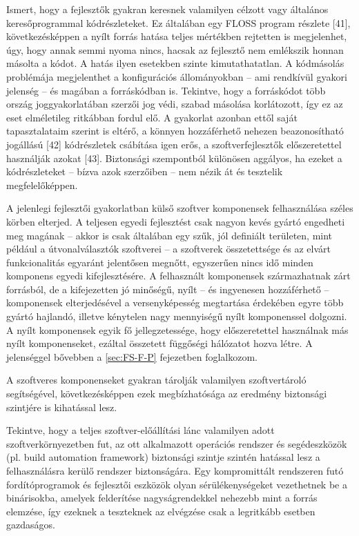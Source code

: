 \documentclass[12pt,magyar,a4paper,oneside]{scrreprt}
\begin{document}
Ismert, hogy a fejlesztők gyakran keresnek valamilyen célzott vagy
általános keresőprogrammal kódrészleteket. Ez általában egy FLOSS
program részlete {[}41{]}, következésképpen a nyílt forrás hatása teljes
mértékben rejtetten is megjelenhet, úgy, hogy annak semmi nyoma nincs,
hacsak az fejlesztő nem emlékszik honnan másolta a kódot. A hatás ilyen
esetekben szinte kimutathatatlan. A kódmásolás problémája megjelenthet a
konfigurációs állományokban -- ami rendkívül gyakori jelenség -- és
magában a forráskódban is. Tekintve, hogy a forráskódot több ország
joggyakorlatában szerzői jog védi, szabad másolása korlátozott, így ez
az eset elméletileg ritkábban fordul elő. A gyakorlat azonban ettől
saját tapasztalataim szerint is eltérő, a könnyen hozzáférhető nehezen
beazonosítható jogállású {[}42{]} kódrészletek csábítása igen erős, a
szoftverfejlesztők előszeretettel használják azokat {[}43{]}. Biztonsági
szempontból különösen aggályos, ha ezeket a kódrészleteket -- bízva azok
szerzőiben -- nem nézik át és tesztelik megfelelőképpen.

A jelenlegi fejlesztői gyakorlatban külső szoftver komponensek
felhasználása széles körben elterjed. A teljesen egyedi fejlesztést csak
nagyon kevés gyártó engedheti meg magának -- akkor is csak általában egy
szűk, jól definiált területen, mint például a útvonalválasztók
szoftverei -- a szoftverek összetettsége és az elvárt funkcionalitás
egyaránt jelentősen megnőtt, egyszerűen nincs idő minden komponens
egyedi kifejlesztésére. A felhasznált komponensek származhatnak zárt
forrásból, de a kifejezetten jó minőségű, nyílt -- és ingyenesen
hozzáférhető -- komponensek elterjedésével a versenyképesség megtartása
érdekében egyre több gyártó hajlandó, illetve kénytelen nagy mennyiségű
nyílt komponenssel dolgozni. A nyílt komponensek egyik fő
jellegzetessége, hogy előszeretettel használnak más nyílt komponenseket,
ezáltal összetett függőségi hálózatot hozva létre. A jelenséggel
bővebben a \ref{sec:FS-F-P} fejezetben foglalkozom.

A szoftveres komponenseket gyakran tárolják valamilyen szoftvertároló
segítségével, következésképpen ezek megbízhatósága az eredmény
biztonsági szintjére is kihatással lesz.

Tekintve, hogy a teljes szoftver-előállítási lánc valamilyen adott
szoftverkörnyezetben fut, az ott alkalmazott operációs rendszer és
segédeszközök (pl. build automation framework) biztonsági szintje
szintén hatással lesz a felhasználásra kerülő rendszer biztonságára. Egy
kompromittált rendszeren futó fordítóprogramok és fejlesztői eszközök
olyan sérülékenységeket vezethetnek be a binárisokba, amelyek
felderítése nagyságrendekkel nehezebb mint a forrás elemzése, így
ezeknek a teszteknek az elvégzése csak a legritkább esetben gazdaságos.
\end{document}
